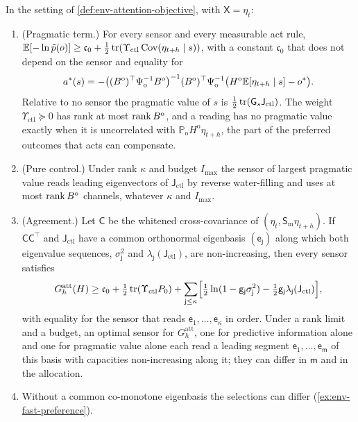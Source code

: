 \begin{theorem}\label{thm:env-control}
In the setting of \cref{def:env-attention-objective}, with $\mathsf X=\eta_t$:
\begin{enumerate}
\item[(a)] (Pragmatic term.) For every sensor and every measurable act rule, $\mathbb{E}[-\ln\tilde p(o)]\ge\mathfrak c_0+\frac12\operatorname{tr}(\Upsilon_{\mathrm{ctl}}\operatorname{Cov}(\eta_{t+h}\mid s))$, with a constant $\mathfrak c_0$ that does not depend on the sensor and equality for
\[
a^\ast(s)=-\bigl((B^{\mathrm o})^\top\Psi_{\mathrm o}^{-1}B^{\mathrm o}\bigr)^{-1}(B^{\mathrm o})^\top\Psi_{\mathrm o}^{-1}\bigl(H^{\mathrm o}\mathbb{E}[\eta_{t+h}\mid s]-o^\ast\bigr).
\]
Relative to no sensor the pragmatic value of $s$ is $\frac12\operatorname{tr}(\mathsf G_s\mathsf J_{\mathrm{ctl}})$. The weight $\Upsilon_{\mathrm{ctl}}\succeq0$ has rank at most $\operatorname{rank} B^{\mathrm o}$, and a reading has no pragmatic value exactly when it is uncorrelated with $\mathbb P_{\mathrm o}H^{\mathrm o}\eta_{t+h}$, the part of the preferred outcomes that acts can compensate.
\item[(b)] (Pure control.) Under rank $\kappa$ and budget $I_{\max}$ the sensor of largest pragmatic value reads leading eigenvectors of $\mathsf J_{\mathrm{ctl}}$ by reverse water-filling and uses at most $\operatorname{rank} B^{\mathrm o}$ channels, whatever $\kappa$ and $I_{\max}$.
\item[(c)] (Agreement.) Let $\mathsf C$ be the whitened cross-covariance of $(\eta_t,\mathsf S_{\mathrm m}\eta_{t+h})$. If $\mathsf C\mathsf C^\top$ and $\mathsf J_{\mathrm{ctl}}$ have a common orthonormal eigenbasis $(\mathsf e_{\mathsf j})$ along which both eigenvalue sequences, $\sigma_{\mathsf j}^2$ and $\lambda_{\mathsf j}(\mathsf J_{\mathrm{ctl}})$, are non-increasing, then every sensor satisfies
\[
G^{\mathrm{att}}_h(H)\ge\mathfrak c_0+\tfrac12\operatorname{tr}(\Upsilon_{\mathrm{ctl}}P_0)+\sum_{\mathsf j\le\kappa}\Bigl[\tfrac12\ln(1-\mathsf g_{\mathsf j}\sigma_{\mathsf j}^2)-\tfrac12\mathsf g_{\mathsf j}\lambda_{\mathsf j}(\mathsf J_{\mathrm{ctl}})\Bigr],
\]
with equality for the sensor that reads $\mathsf e_1,\dots,\mathsf e_\kappa$ in order. Under a rank limit and a budget, an optimal sensor for $G^{\mathrm{att}}_h$, one for predictive information alone and one for pragmatic value alone each read a leading segment $\mathsf e_1,\dots,\mathsf e_{\mathsf m}$ of this basis with capacities non-increasing along it; they can differ in $\mathsf m$ and in the allocation.
\item[(d)] Without a common co-monotone eigenbasis the selections can differ (\cref{ex:env-fast-preference}).
\end{enumerate}
\end{theorem}

